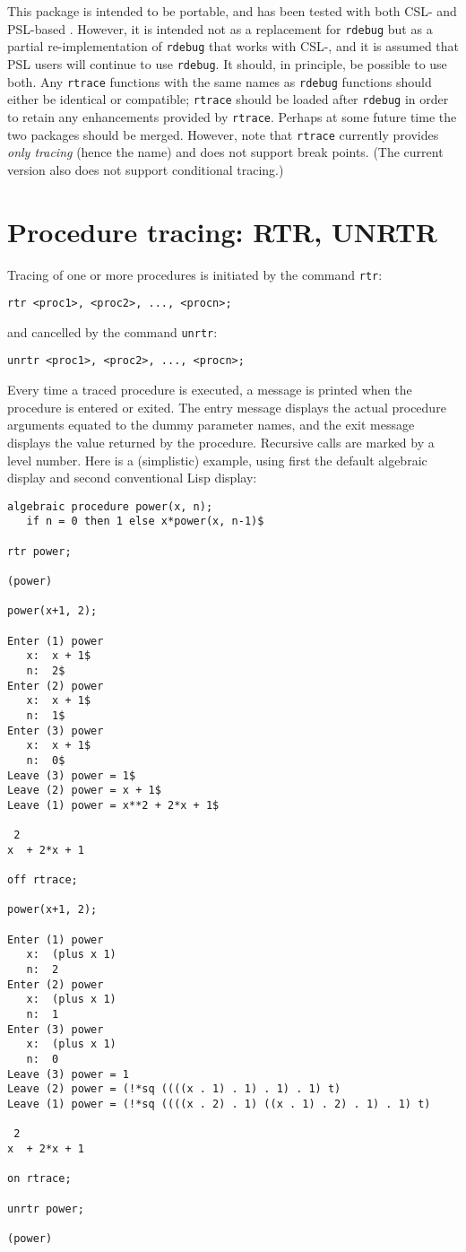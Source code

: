 \documentclass[11pt,a4paper]{article}
\newcommand{\rdebug}{\texttt{rdebug}}
\newcommand{\rtrace}{\texttt{rtrace}}
\begin{document}
This package is intended to be portable, and has been tested with both
CSL- and PSL-based \REDUCE{}.  However, it is intended not as a
replacement for \rdebug{} but as a partial re-implementation of
\rdebug{} that works with CSL-\REDUCE{}, and it is assumed that PSL
users will continue to use \rdebug{}.  It should, in principle, be
possible to use both.  Any \rtrace{} functions with the same names as
\rdebug{} functions should either be identical or compatible;
\rtrace{} should be loaded after \rdebug{} in order to retain any
enhancements provided by \rtrace{}.  Perhaps at some future time the
two packages should be merged.  However, note that \rtrace{} currently
provides \emph{only tracing} (hence the name) and does not support
break points.  (The current version also does not support conditional
tracing.)

\section{Procedure tracing: RTR, UNRTR}

Tracing of one or more procedures is initiated by the command
\texttt{rtr}:
\begin{verbatim}
rtr <proc1>, <proc2>, ..., <procn>;
\end{verbatim}
and cancelled by the command \texttt{unrtr}:
\begin{verbatim}
unrtr <proc1>, <proc2>, ..., <procn>;
\end{verbatim}

Every time a traced procedure is executed, a message is printed when
the procedure is entered or exited.  The entry message displays the
actual procedure arguments equated to the dummy parameter names, and
the exit message displays the value returned by the procedure.
Recursive calls are marked by
a level number.  Here is a (simplistic) example, using first the
default algebraic display and second conventional Lisp display:
\begin{verbatim}
algebraic procedure power(x, n);
   if n = 0 then 1 else x*power(x, n-1)$

rtr power;

(power)

power(x+1, 2);

Enter (1) power
   x:  x + 1$
   n:  2$
Enter (2) power
   x:  x + 1$
   n:  1$
Enter (3) power
   x:  x + 1$
   n:  0$
Leave (3) power = 1$
Leave (2) power = x + 1$
Leave (1) power = x**2 + 2*x + 1$

 2
x  + 2*x + 1

off rtrace;

power(x+1, 2);

Enter (1) power
   x:  (plus x 1)
   n:  2
Enter (2) power
   x:  (plus x 1)
   n:  1
Enter (3) power
   x:  (plus x 1)
   n:  0
Leave (3) power = 1
Leave (2) power = (!*sq ((((x . 1) . 1) . 1) . 1) t)
Leave (1) power = (!*sq ((((x . 2) . 1) ((x . 1) . 2) . 1) . 1) t)

 2
x  + 2*x + 1

on rtrace;

unrtr power;

(power)
\end{verbatim}
\end{document}
